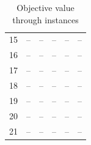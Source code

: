 \begin{table}[h]
\begin{tabular}{cccccc}
            15 & -- &       -- &    -- &    -- &    -- \\ 
            16 & -- &       -- &    -- &    -- &    -- \\ 
            17 & -- &       -- &    -- &    -- &    -- \\ 
            18 & -- &       -- &    -- &    -- &    -- \\ 
            19 & -- &       -- &    -- &    -- &    -- \\ 
            20 & -- &       -- &    -- &    -- &    -- \\ 
            21 & -- &       -- &    -- &    -- &    -- \\ 
            \bottomrule
    \end{tabular}
    \caption{Objective value through instances}
\end{table}



